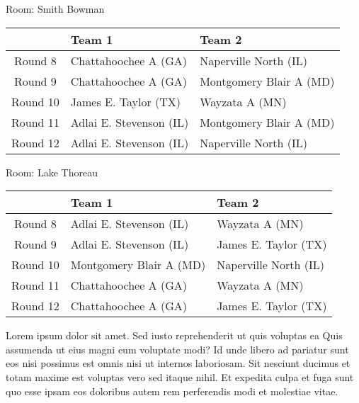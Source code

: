 \documentclass{article}%
\begin{document}
\vspace*{8pt}%
\linebreak%
\begin{flushleft}%
\begin{Large}%
Room: Smith Bowman%
\end{Large}%
\end{flushleft}%
\begin{tabularx}{\textwidth}{|c|Y|Y|}%
\hline%
&Team 1&Team 2\\%
\hline%
Round 8&Chattahoochee A (GA)&Naperville North (IL)\\%
Round 9&Chattahoochee A (GA)&Montgomery Blair A (MD)\\%
Round 10&James E. Taylor (TX)&Wayzata A (MN)\\%
Round 11&Adlai E. Stevenson (IL)&Montgomery Blair A (MD)\\%
Round 12&Adlai E. Stevenson (IL)&Naperville North (IL)\\%
\hline%
\end{tabularx}%
\vspace*{8pt}%
\linebreak%
\begin{flushleft}%
\begin{Large}%
Room: Lake Thoreau%
\end{Large}%
\end{flushleft}%
\begin{tabularx}{\textwidth}{|c|Y|Y|}%
\hline%
&Team 1&Team 2\\%
\hline%
Round 8&Adlai E. Stevenson (IL)&Wayzata A (MN)\\%
Round 9&Adlai E. Stevenson (IL)&James E. Taylor (TX)\\%
Round 10&Montgomery Blair A (MD)&Naperville North (IL)\\%
Round 11&Chattahoochee A (GA)&Wayzata A (MN)\\%
Round 12&Chattahoochee A (GA)&James E. Taylor (TX)\\%
\hline%
\end{tabularx}%
\vspace*{8pt}%
\linebreak%
\newline%
Lorem ipsum dolor sit amet. Sed iusto reprehenderit ut quis voluptas ea Quis assumenda ut eius magni eum voluptate modi? Id unde libero ad pariatur sunt eos nisi possimus est omnis nisi ut internos laboriosam. Sit nesciunt ducimus et totam maxime est voluptas vero sed itaque nihil. Et expedita culpa et fuga sunt quo esse ipsam eos doloribus autem rem perferendis modi et molestiae vitae.\newline%
\end{document}
